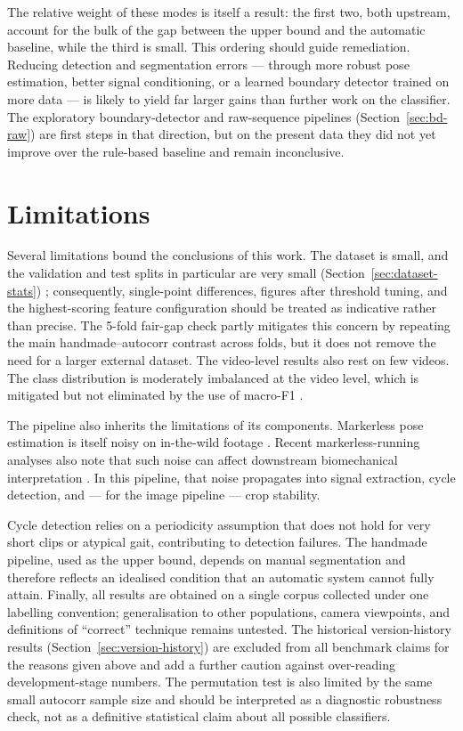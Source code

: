 The relative weight of these modes is itself a result: the first two,
both upstream, account for the bulk of the gap between the upper bound and the
automatic baseline, while the third is small. This ordering should guide
remediation. Reducing detection and segmentation errors --- through more robust
pose estimation, better signal conditioning, or a learned boundary detector
trained on more data --- is likely to yield far larger gains than further work
on the classifier. The exploratory boundary-detector and raw-sequence pipelines
(Section~\ref{sec:bd-raw}) are first steps in that direction, but on the present
data they did not yet improve over the rule-based baseline and remain
inconclusive.

\section{Limitations}
\label{sec:disc-limitations}

Several limitations bound the conclusions of this work. The dataset is small,
and the validation and test splits in particular are very small
(Section~\ref{sec:dataset-stats}) ; consequently, single-point differences,
figures after threshold tuning, and the highest-scoring feature configuration
should be treated as indicative rather than precise. The 5-fold fair-gap check
partly mitigates this concern by repeating the main handmade--autocorr contrast
across folds, but it does not remove the need for a larger external dataset. The video-level results
also rest on few videos. The class distribution is moderately imbalanced at the
video level, which is mitigated but not eliminated by the use of macro-F1
\cite{sokolova2009metrics}.

The pipeline also inherits the limitations of its components. Markerless pose
estimation is itself noisy on in-the-wild footage \cite{bazarevsky2020blazepose}.
Recent markerless-running analyses also note that such noise can affect
downstream biomechanical interpretation \cite{panconi2024markerless}. In this
pipeline, that noise propagates into signal extraction, cycle detection, and
--- for the image pipeline --- crop stability. 

Cycle detection relies on a
periodicity assumption that does not hold for very short clips or atypical gait,
contributing to detection failures. The handmade pipeline, used as the upper
bound, depends on manual segmentation and therefore reflects an idealised
condition that an automatic system cannot fully attain. Finally, all results
are obtained on a single corpus collected under one labelling convention;
generalisation to other populations, camera viewpoints, and definitions of
``correct'' technique remains untested. The historical version-history results
(Section~\ref{sec:version-history}) are excluded from all benchmark claims for
the reasons given above and add a further caution against over-reading
development-stage numbers. The permutation test is also limited by the same
small autocorr sample size and should be interpreted as a diagnostic robustness
check, not as a definitive statistical claim about all possible classifiers.


